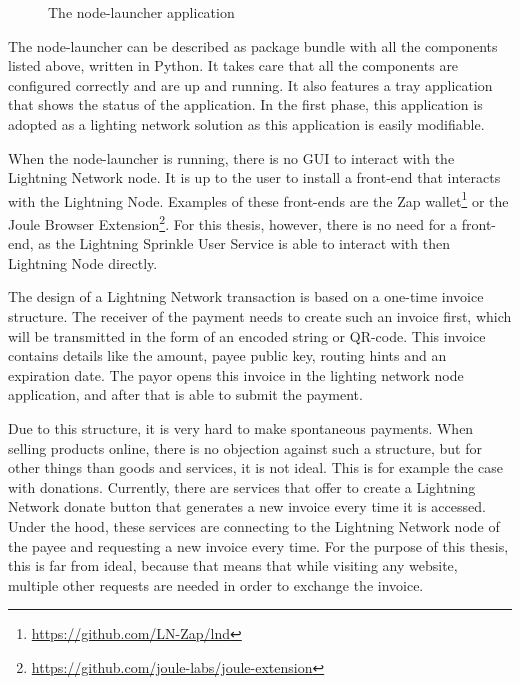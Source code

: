 
\begin{figure}[h!]
  \setlength{\fboxsep}{0pt}%
  \center
  \caption{The node-launcher application}
\end{figure}

The node-launcher can be described as package bundle with all the components listed above, written in Python. It takes care that all the components are configured correctly and are up and running. It also features a tray application that shows the status of the application. In the first phase, this application is adopted as a lighting network solution as this application is easily modifiable.

When the node-launcher is running, there is no GUI to interact with the Lightning Network node. It is up to the user to install a front-end that interacts with the Lightning Node. Examples of these front-ends are the Zap wallet\footnote{\url{https://github.com/LN-Zap/lnd}} or the Joule Browser Extension\footnote{\url{https://github.com/joule-labs/joule-extension}}. For this thesis, however, there is no need for a front-end, as the Lightning Sprinkle User Service is able to interact with then Lightning Node directly. 

The design of a Lightning Network transaction is based on a one-time invoice structure. The receiver of the payment needs to create such an invoice first, which will be transmitted in the form of an encoded string or QR-code. This invoice contains details like the amount, payee public key, routing hints and an expiration date. The payor opens this invoice in the lighting network node application, and after that is able to submit the payment.

Due to this structure, it is very hard to make spontaneous payments. When selling products online, there is no objection against such a structure, but for other things than goods and services, it is not ideal. This is for example the case with donations. Currently, there are services that offer to create a Lightning Network donate button that generates a new invoice every time it is accessed. Under the hood, these services are connecting to the Lightning Network node of the payee and requesting a new invoice every time. For the purpose of this thesis, this is far from ideal, because that means that while visiting any website, multiple other requests are needed in order to exchange the invoice. 

